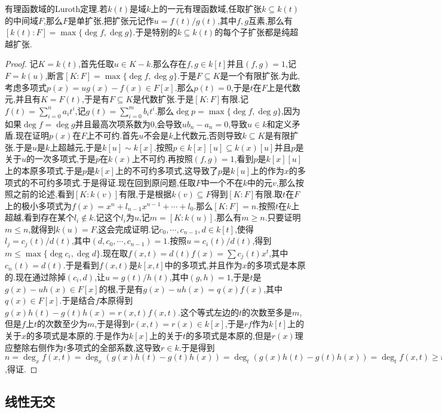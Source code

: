 有理函数域的Luroth定理.若$k(t)$是域$k$上的一元有理函数域,任取扩张$k\subseteq k(t)$的中间域$F$,那么$F$是单扩张,把扩张元记作$u=f(t)/g(t)$,其中$f,g$互素,那么有$[k(t):F]=\max\{\deg f,\deg g\}$.于是特别的$k\subseteq k(t)$的每个子扩张都是纯超越扩张.
\begin{proof}
	
	记$K=k(t)$,首先任取$u\in K-k$.那么存在$f,g\in k[t]$并且$(f,g)=1$,记$F=k(u)$,断言$[K:F]=\max\{\deg f,\deg g\}$.于是$F\subseteq K$是一个有限扩张.为此,考虑多项式$p(x)=ug(x)-f(x)\in F[x]$.那么$p(t)=0$,于是$t$在$F$上是代数元,并且有$K=F(t)$,于是有$F\subseteq K$是代数扩张.于是$[K:F]$有限.记$f(t)=\sum_{i=0}^{n}a_it^i$,记$g(t)=\sum_{i=0}^{m}b_it^i$.那么$\deg p=\max\{\deg f,\deg g\}$,因为如果$\deg f=\deg g$并且最高次项系数为0,会导致$ub_n-a_n=0$,导致$u\in k$和定义矛盾.现在证明$p(x)$在$F$上不可约.首先$u$不会是$k$上代数元,否则导致$k\subseteq K$是有限扩张.于是$u$是$k$上超越元,于是$k[u]\sim k[x]$.按照$p\in k[x][u]\subseteq k(x)[u]$并且$p$是关于$u$的一次多项式,于是$p$在$k(x)$上不可约.再按照$(f,g)=1$,看到$p$是$k[x][u]$上的本原多项式.于是$p$是$k[x]$上的不可约多项式,这导致了$p$是$k[u]$上的作为$x$的多项式的不可约多项式.于是得证.现在回到原问题,任取$F$中一个不在$k$中的元$v$,那么按照之前的论述,看到$[K:k(v)]$有限,于是根据$k(v)\subseteq F$得到$[K:F]$有限.取$t$在$F$上的极小多项式为$f(x)=x^n+l_{n-1}x^{n-1}+\cdots+l_0$.那么$[K:F]=n$.按照$t$在$k$上超越,看到存在某个$l_i\not\in k$.记这个$l_i$为$u$,记$m=[K:k(u)]$.那么有$m\ge n$.只要证明$m\le n$,就得到$k(u)=F$,这会完成证明.记$c_0,\cdots,c_{n-1},d\in k[t]$,使得$l_j=c_j(t)/d(t)$,其中$(d,c_0,\cdots,c_{n-1})=1$.按照$u=c_i(t)/d(t)$,得到$m\le\max\{\deg c_i,\deg d\}$.现在取$f(x,t)=d(t)f(x)=\sum c_j(t)x^t$,其中$c_n(t)=d(t)$.于是看到$f(x,t)$是$k[x,t]$中的多项式,并且作为$x$的多项式是本原的.现在通过除掉$(c_i,d)$,让$u=g(t)/h(t)$,其中$(g,h)=1$,于是$t$是$g(x)-uh(x)\in F[x]$的根,于是有$g(x)-uh(x)=q(x)f(x)$,其中$q(x)\in F[x]$.于是结合$f$本原得到$g(x)h(t)-g(t)h(x)=r(x,t)f(x,t)$.这个等式左边的$t$的次数至多是$m$,但是$f$上$t$的次数至少为$m$,于是得到$r(x,t)=r(x)\in k[x]$,于是$rf$作为$k[t]$上的关于$x$的多项式是本原的.于是作为$k[x]$上的关于$t$的多项式是本原的,但是$r(x)$理应整除右侧作为$t$多项式的全部系数,这导致$r\in k$.于是得到$n=\deg_xf(x,t)=\deg_x(g(x)h(t)-g(t)h(x))=\deg_t(g(x)h(t)-g(t)h(x))=\deg_tf(x,t)\ge m$,得证.
\end{proof}
\newpage
\subsection{线性无交}


